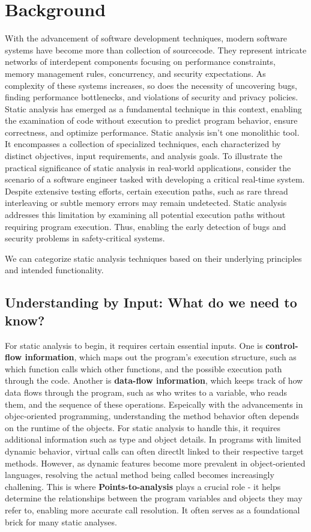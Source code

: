 \section{Background}
With the advancement of software development techniques, modern software systems have become more than collection of sourcecode. They represent intricate networks of interdepent components focusing on performance constraints, 
memory management rules, concurrency, and security expectations. As complexity of these systems increases, so does the necessity of uncovering bugs, finding performance bottlenecks, and violations of security and privacy policies.
Static analysis has emerged  as a fundamental technique in this context, enabling the examination of code without execution to predict program behavior, ensure correctness, and optimize performance.
Static analysis isn't one monolithic tool. It encompasses a collection of specialized techniques, each characterized by distinct objectives, input requirements, and analysis goals.
To illustrate the practical significance of static analysis in real-world applications, consider the scenario of a software engineer tasked with developing a critical real-time system.
Despite extensive testing efforts, certain execution paths, such as rare thread interleaving or subtle memory errors may remain undetected. Static analysis addresses this limitation by examining all potential execution paths without requiring program execution.
Thus, enabling the early detection of bugs and security problems in safety-critical systems. 

We can categorize static analysis techniques based on their underlying principles and intended functionality.

\subsection{Understanding by Input: What do we need to know?}
For static analysis to begin, it requires certain essential inputs. One is \textbf{control-flow information}, which maps out the program's execution structure, such as which function calls which other functions, and the possible execution path through the code.
Another is \textbf{data-flow information}, which keeps track of how data flows through the program, such as who writes to a variable, who reads them, and the sequence of these operations.
Espeically with the advancements in objec-oriented programming, understanding the method behavior often depends on the runtime of the objects. For static analysis to handle this, it requires additional information such as type and object details.
In programs with limited dynamic behavior, virtual calls can often directlt linked to their respective target methods. However, as dynamic features become more prevalent in object-oriented languages, resolving the actual method being called becomes increasingly challening. 
This is where \textbf{Points-to-analysis} \cite{lhotak2003scaling} plays a crucial role - it helps determine the relationships between the program variables and objects they may refer to, enabling more accurate call resolution.
It often serves as a foundational brick for many static analyses.

